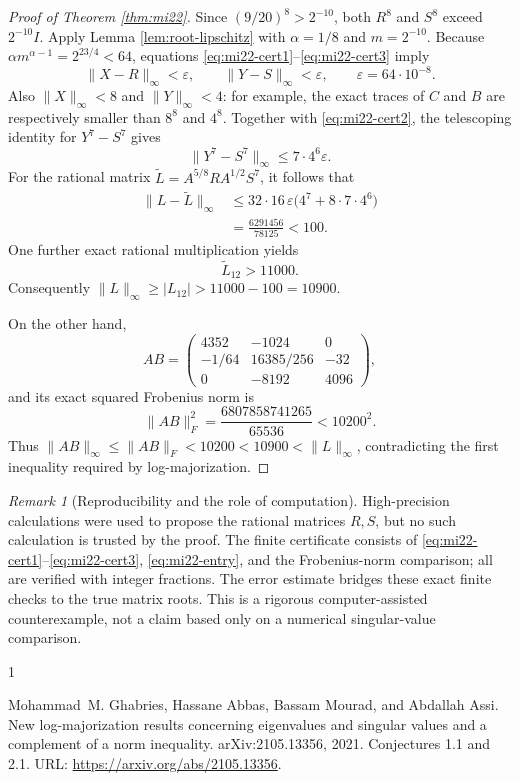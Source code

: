\documentclass[10pt,a4paper]{article}
\theoremstyle{remark}
\newtheorem{remark}[theorem]{Remark}
\newcommand{\norm}[1]{\lVert #1\rVert}
\newcommand{\opnorm}[1]{\lVert #1\rVert_{\infty}}
\begin{document}
\begin{proof}[Proof of Theorem \ref{thm:mi22}]
Since $(9/20)^8>2^{-10}$, both $R^8$ and $S^8$ exceed $2^{-10}I$. Apply Lemma \ref{lem:root-lipschitz} with $\alpha=1/8$ and $m=2^{-10}$. Because $\alpha m^{\alpha-1}=2^{23/4}<64$, equations \eqref{eq:mi22-cert1}--\eqref{eq:mi22-cert3} imply
\[
 \opnorm{X-R}<\varepsilon,\qquad \opnorm{Y-S}<\varepsilon,
 \qquad \varepsilon=64\cdot10^{-8}.
\]
Also $\opnorm{X}<8$ and $\opnorm{Y}<4$: for example, the exact traces of $C$ and $B$ are respectively smaller than $8^8$ and $4^8$. Together with \eqref{eq:mi22-cert2}, the telescoping identity for $Y^7-S^7$ gives
\[
 \opnorm{Y^7-S^7}\leq7\cdot4^6\varepsilon.
\]
For the rational matrix $\widetilde L=A^{5/8}RA^{1/2}S^7$, it follows that
\begin{align*}
 \opnorm{L-\widetilde L}
 &\leq32\cdot16\,\varepsilon\bigl(4^7+8\cdot7\cdot4^6\bigr)\\
 &=\frac{6291456}{78125}<100.
\end{align*}
One further exact rational multiplication yields
\begin{equation}\label{eq:mi22-entry}
 \widetilde L_{12}>11000.
\end{equation}
Consequently $\opnorm{L}\geq|L_{12}|>11000-100=10900$.

On the other hand,
\[
 AB=\begin{pmatrix}4352&-1024&0\\-1/64&16385/256&-32\\0&-8192&4096\end{pmatrix},
\]
and its exact squared Frobenius norm is
\[
 \norm{AB}_F^2=\frac{6807858741265}{65536}<10200^2.
\]
Thus $\opnorm{AB}\leq\norm{AB}_F<10200<10900<\opnorm{L}$, contradicting the first inequality required by log-majorization.
\end{proof}

\begin{remark}[Reproducibility and the role of computation]
High-precision calculations were used to propose the rational matrices $R,S$, but no such calculation is trusted by the proof. The finite certificate consists of \eqref{eq:mi22-cert1}--\eqref{eq:mi22-cert3}, \eqref{eq:mi22-entry}, and the Frobenius-norm comparison; all are verified with integer fractions. The error estimate bridges these exact finite checks to the true matrix roots. This is a rigorous computer-assisted counterexample, not a claim based only on a numerical singular-value comparison.
\end{remark}

\begin{thebibliography}{1}

Mohammad~M. Ghabries, Hassane Abbas, Bassam Mourad, and Abdallah Assi.
\newblock New log-majorization results concerning eigenvalues and singular
  values and a complement of a norm inequality.
\newblock arXiv:2105.13356, 2021.
\newblock Conjectures 1.1 and 2.1.
\newblock URL: \url{https://arxiv.org/abs/2105.13356}.

\end{thebibliography}
\end{document}
